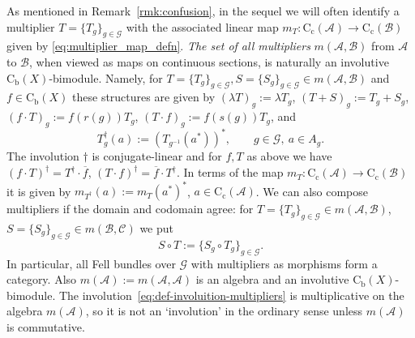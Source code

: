 \documentclass[11 pt, leqno]{amsart}
\numberwithin{equation}{section}
\theoremstyle{plain}
\theoremstyle{definition}
\newcommand*{\contc}{\mathrm{C_c}}%
\newcommand*{\contb}{\mathrm{C_b}}%
\renewcommand{\star}{*}
\newcommand{\B}{\mathcal B}
\newcommand{\m}{m}
\newcommand{\G}{\mathcal G} %
\newcommand{\CC}{\mathcal C}
\newcommand{\A}{\mathcal A}
\newcommand*{\bcomment}[1]{{\color{blue}#1}}
\begin{document}
As mentioned in Remark~\ref{rmk:confusion}, in the sequel we will often identify a multiplier $T=\{T_g\}_{g\in \G}$ with the associated linear map $\m_T:\contc(\A)\to \contc(\B)$ given by \eqref{eq:multiplier_map_defn}. 
\emph{The set of all multipliers} $\m(\A, \B)$ from $\A$ to $\B$, when viewed as maps on continuous sections, is naturally an involutive $\contb(X)$-bimodule. 
Namely, for $T=\{T_g\}_{g\in \G}, S=\{S_g\}_{g\in \G}\in \m(\A, \B)$ and $f \in \contb(X)$ these structures are given by $(\lambda T)_g := \lambda T_g$, $(T+S)_g := T_g +S_g$, $ (f \cdot T)_g := f(r (g)) T_g$,  $(T \cdot f)_g := f(s(g))T_g $, and
\begin{equation}\label{eq:def-involuition-multipliers}
    T^{\dagger}_g(a) := (T_{g^{-1}} (a^{\star}))^{\star}, \qquad g \in \G,\ a \in A_g.
\end{equation}
The involution $\dagger$ is conjugate-linear and for $f,T$ as above we have $(f \cdot T)^{\dagger}=T^{\dagger}\cdot \overline{f}$, $(T\cdot f)^{\dagger}=\overline{f} \cdot T^{\dagger}$. 
In terms of the map $\m_T:\contc(\A)\to \contc(\B)$ it is given by $\m_{T^\dagger}(a):= \m_T(a^*)^*$, $a\in \contc(\A)$. 
We can also compose multipliers if the domain and codomain agree: 
for $T=\{T_g\}_{g\in \G}\in \m(\A, \B)$, $S = \{S_g\}_{g\in \G}\in \m(\B, \CC)$ we put
\[
    S\circ T := \{ S_g \circ T_g \}_{g\in \G}.
\]
In particular, all Fell bundles over $\G$ with multipliers as morphisms form a category. 
Also $\m(\A):=\m(\A, \A)$ is an algebra and an involutive $\contb(X)$-bimodule.
The involution~\eqref{eq:def-involuition-multipliers} is multiplicative on the algebra $\m(\A)$, so it is not an `involution' in the ordinary sense unless $\m(\A)$ is commutative. %
\end{document}
